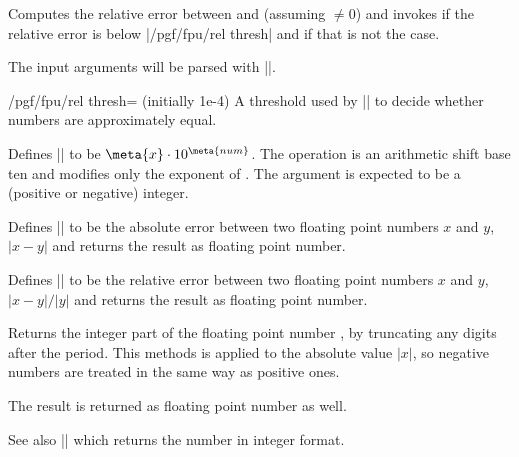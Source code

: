 \begin{command}{\pgfmathfloatifapproxequalrel{}}
	Computes the relative error between  and  (assuming $\neq 0$) and
	invokes  if the relative error is below |/pgf/fpu/rel thresh| and
	 if that is not the case.

	The input arguments will be parsed with |\pgfmathfloatparsenumber|.

	\begin{key}{/pgf/fpu/rel thresh= (initially 1e-4)}
		A threshold used by |\pgfmathfloatifapproxequalrel| to decide whether numbers are approximately equal.
	\end{key}
\end{command}


\begin{command}{}
	Defines |\pgfmathresult| to be $\meta{x} \cdot 10^{\meta{num}}$. The operation is an arithmetic shift base ten and modifies only the exponent of . The argument  is expected to be a (positive or negative) integer.
\end{command}


\begin{command}{\pgfmathfloatabserror{}}
	Defines |\pgfmathresult| to be the absolute error between two floating point numbers $x$ and $y$, $\lvert x - y\rvert $ and returns the result as floating point number.
\end{command}

\begin{command}{\pgfmathfloatrelerror{}}
	Defines |\pgfmathresult| to be the relative error between two floating point numbers $x$ and $y$, $\lvert x - y\rvert / \lvert y \rvert $ and returns the result as floating point number.
\end{command}


\begin{command}{\pgfmathfloatint{}}
Returns the integer part of the floating point number , by truncating any digits after the period. This methods is applied to the absolute value $\rvert x \lvert$, so negative numbers are treated in the same way as positive ones.

The result is returned as floating point number as well.

See also |\pgfmathfloattoint| which returns the number in integer format.
\end{command}

